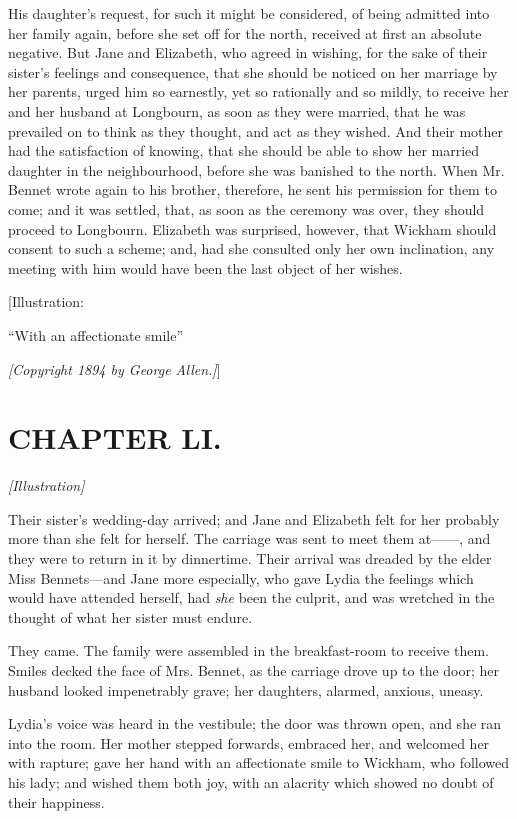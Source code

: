 \documentclass[12pt]{book}
\begin{document}
His daughter's request, for such it might be considered, of being admitted into her family again, before she set off for the north, received at first an absolute negative. But Jane and Elizabeth, who agreed in wishing, for the sake of their sister's feelings and consequence, that she should be noticed on her marriage by her parents, urged him so earnestly, yet so rationally and so mildly, to receive her and her husband at Longbourn, as soon as they were married, that he was prevailed on to think as they thought, and act as they wished. And their mother had the satisfaction of knowing, that she should be able to show her married daughter in the neighbourhood, before she was banished to the north. When Mr. Bennet wrote again to his brother, therefore, he sent his permission for them to come; and it was settled, that, as soon as the ceremony was over, they should proceed to Longbourn. Elizabeth was surprised, however, that Wickham should consent to such a scheme; and, had she consulted only her own inclination, any meeting with him would have been the last object of her wishes.

[Illustration:

``With an affectionate smile''

\emph{[\textit{Copyright 1894 by George Allen.}]}]

\chapter{CHAPTER LI.}

\emph{[Illustration]}

Their sister's wedding-day arrived; and Jane and Elizabeth felt for her probably more than she felt for herself. The carriage was sent to meet them at------, and they were to return in it by dinnertime. Their arrival was dreaded by the elder Miss Bennets---and Jane more especially, who gave Lydia the feelings which would have attended herself, had \textit{she} been the culprit, and was wretched in the thought of what her sister must endure.

They came. The family were assembled in the breakfast-room to receive them. Smiles decked the face of Mrs. Bennet, as the carriage drove up to the door; her husband looked impenetrably grave; her daughters, alarmed, anxious, uneasy.

Lydia's voice was heard in the vestibule; the door was thrown open, and she ran into the room. Her mother stepped forwards, embraced her, and welcomed her with rapture; gave her hand with an affectionate smile to Wickham, who followed his lady; and wished them both joy, with an alacrity which showed no doubt of their happiness.
\end{document}
